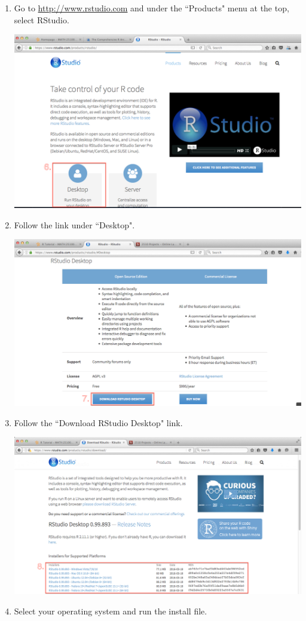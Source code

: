 \documentclass{article}
\begin{document}
\begin{enumerate}
\item Go to \url{http://www.rstudio.com} and under the ``Products" menu at the top, select RStudio.

\vfill

\newpage

\includegraphics[width=\textwidth-1.65cm]{RInstall5.png}

\item Follow the link under ``Desktop".

\vfill


\includegraphics[width=\textwidth-1.65cm]{RInstall6.png}

\item Follow the ``Download RStudio Desktop" link.

\vfill

\newpage

\includegraphics[width=\textwidth-1.65cm]{RInstall7.png}

\item Select your operating system and run the install file.

\end{enumerate}
\end{document}
